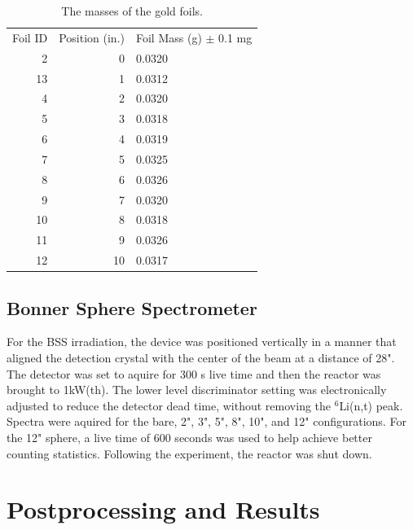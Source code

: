 \begin{table}[h]\centering
\label{tab:au_masses}
\caption{The masses of the gold foils.}
\begin{tabular}{ r | r | l }
\toprule
Foil ID  & Position (in.)     &   Foil Mass (g) $\pm$ 0.1 mg\\
2 & 0 & 0.0320\\
13 & 1 & 0.0312\\
4 & 2 & 0.0320\\
5 & 3 & 0.0318\\
6 & 4 & 0.0319\\
7 & 5 & 0.0325\\
8 & 6 & 0.0326\\
9 & 7 & 0.0320\\
10 & 8 & 0.0318\\
11 & 9 & 0.0326\\
12 & 10 & 0.0317\\
\end{tabular}
\end{table}

\subsection{Bonner Sphere Spectrometer}

For the BSS irradiation, the device was positioned vertically in a manner that aligned the detection crystal with the center of the beam at a distance of 28".
The detector was set to aquire for 300 s live time and then the reactor was brought to 1kW(th).
The lower level discriminator setting was electronically adjusted to reduce the detector dead time, without removing the $^6$Li(n,t) peak.
Spectra were aquired for the bare, 2", 3", 5", 8", 10", and 12" configurations.
For the 12" sphere, a live time of 600 seconds was used to help achieve better counting statistics.
Following the experiment, the reactor was shut down.


\section{Postprocessing and Results}


